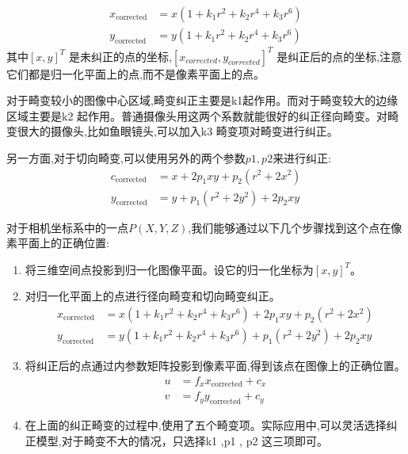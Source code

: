 \begin{equation}
\begin{aligned} x_{\text {corrected}} &=x\left(1+k_{1} r^{2}+k_{2} r^{4}+k_{3} r^{6}\right) \\ y_{\text {corrected}} &=y\left(1+k_{1} r^{2}+k_{2} r^{4}+k_{3} r^{6}\right) \end{aligned}
\end{equation}
其中$[x,y]^T$ 是未纠正的点的坐标,$[x_{corrected},y_{corrected}]^T$ 是纠正后的点的坐标,注意它们都是归一化平面上的点,而不是像素平面上的点。\par
对于畸变较小的图像中心区域,畸变纠正主要是k1起作用。而对于畸变较大的边缘区域主要是k2 起作用。普通摄像头用这两个系数就能很好的纠正径向畸变。对畸变很大的摄像头,比如鱼眼镜头,可以加入k3 畸变项对畸变进行纠正。\par
另一方面,对于切向畸变,可以使用另外的两个参数$p1 ,p2$来进行纠正:
\begin{equation}
\begin{aligned} c_{\text {corrected}} &=x+2 p_{1} x y+p_{2}\left(r^{2}+2 x^{2}\right) \\ y_{\text {corrected}} &=y+p_{1}\left(r^{2}+2 y^{2}\right)+2 p_{2} x y \end{aligned}
\end{equation}\par
对于相机坐标系中的一点$P(X,Y,Z)$,我们能够通过以下几个步骤找到这个点在像素平面上的正确位置:\par
\begin{enumerate}
\item 将三维空间点投影到归一化图像平面。设它的归一化坐标为$[x,y]^T$。
\item 对归一化平面上的点进行径向畸变和切向畸变纠正。
\begin{equation}
\begin{aligned} x_{\text {corrected}} &=x\left(1+k_{1} r^{2}+k_{2} r^{4}+k_{3} r^{6}\right)+2 p_{1} x y+p_{2}\left(r^{2}+2 x^{2}\right) \\ y_{\text {corrected}} &=y\left(1+k_{1} r^{2}+k_{2} r^{4}+k_{3} r^{6}\right)+p_{1}\left(r^{2}+2 y^{2}\right)+2 p_{2} x y \end{aligned}
\end{equation}
\item 将纠正后的点通过内参数矩阵投影到像素平面,得到该点在图像上的正确位置。
\begin{equation}
\begin{aligned} u &=f_{x} x_{\text {corrected}}+c_{x} \\ v &=f_{y} y_{\text {corrected}}+c_{y} \end{aligned}
\end{equation}
\item 在上面的纠正畸变的过程中,使用了五个畸变项。实际应用中,可以灵活选择纠正模型,对于畸变不大的情况，只选择k1 ,p1 , p2 这三项即可。
\end{enumerate}

